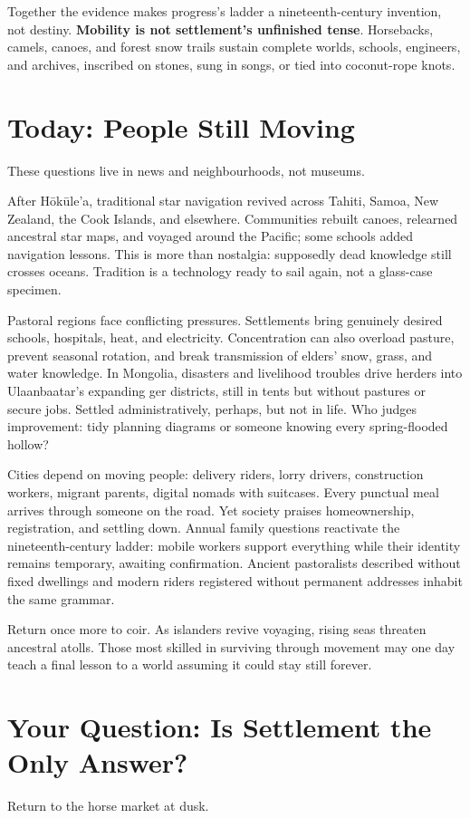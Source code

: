 Together the evidence makes progress's ladder a nineteenth-century invention, not destiny. \textbf{Mobility is not settlement's unfinished tense}. Horsebacks, camels, canoes, and forest snow trails sustain complete worlds, schools, engineers, and archives, inscribed on stones, sung in songs, or tied into coconut-rope knots.

\section{Today: People Still Moving}
These questions live in news and neighbourhoods, not museums.

After Hōkūle'a, traditional star navigation revived across Tahiti, Samoa, New Zealand, the Cook Islands, and elsewhere. Communities rebuilt canoes, relearned ancestral star maps, and voyaged around the Pacific; some schools added navigation lessons. This is more than nostalgia: supposedly dead knowledge still crosses oceans. Tradition is a technology ready to sail again, not a glass-case specimen.

Pastoral regions face conflicting pressures. Settlements bring genuinely desired schools, hospitals, heat, and electricity. Concentration can also overload pasture, prevent seasonal rotation, and break transmission of elders' snow, grass, and water knowledge. In Mongolia, disasters and livelihood troubles drive herders into Ulaanbaatar's expanding ger districts, still in tents but without pastures or secure jobs. Settled administratively, perhaps, but not in life. Who judges improvement: tidy planning diagrams or someone knowing every spring-flooded hollow?

Cities depend on moving people: delivery riders, lorry drivers, construction workers, migrant parents, digital nomads with suitcases. Every punctual meal arrives through someone on the road. Yet society praises homeownership, registration, and settling down. Annual family questions reactivate the nineteenth-century ladder: mobile workers support everything while their identity remains temporary, awaiting confirmation. Ancient pastoralists described without fixed dwellings and modern riders registered without permanent addresses inhabit the same grammar.

Return once more to coir. As islanders revive voyaging, rising seas threaten ancestral atolls. Those most skilled in surviving through movement may one day teach a final lesson to a world assuming it could stay still forever.

\section[Your Question: Must We Settle?]{Your Question: Is Settlement the Only Answer?}
Return to the horse market at dusk.

